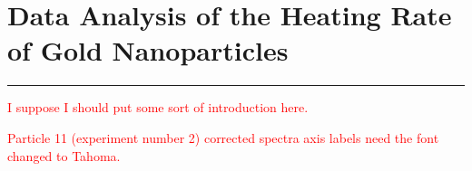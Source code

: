 \chapter{Data Analysis of the Heating Rate of Gold Nanoparticles}
\label{\thechapter}
\label{app:Heating}


\rule{\textwidth}{1.6pt}
\minitoc
\clearpage
{}


\textcolor{red}{I suppose I should put some sort of introduction here.}

\textcolor{red}{Particle 11 (experiment number 2) corrected spectra axis labels need the font changed to Tahoma.}
\clearpage

\newpage
\setcounter{ExperimentNumber}{8}
\setcounter{Heating}{414}
\setcounter{Error}{20}
